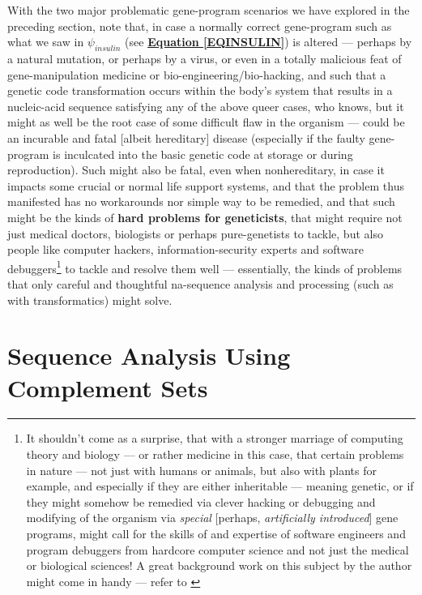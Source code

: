 \documentclass[a4paper, 18pt]{book} %
\begin{document}
With the two major problematic gene-program scenarios we have explored in the preceding section, note that, in case a normally correct gene-program such as what we saw in $\psi_{insulin}$ (see \textbf{\hyperref[EQINSULIN]{Equation \ref{EQINSULIN}}}) is altered --- perhaps by a natural mutation, or perhaps by a virus, or even in a totally malicious feat of gene-manipulation medicine or bio-engineering/bio-hacking, and such that a genetic code transformation occurs within the body's system that results in a nucleic-acid sequence satisfying any of the above queer cases, who knows, but it might as well be the root case of some difficult flaw in the organism --- could be an incurable and fatal [albeit hereditary] disease (especially if the faulty gene-program is inculcated into the basic genetic code at storage or during reproduction). Such might also be fatal, even when nonhereditary, in case it impacts some crucial or normal life support systems, and that the problem thus manifested has no workarounds nor simple way to be remedied, and that such might be the kinds of \textbf{hard problems for geneticists}, that might require not just medical doctors, biologists or perhaps pure-genetists to tackle, but also people like computer hackers, information-security experts and software debuggers\footnote{It shouldn't come as a surprise, that with a stronger marriage of computing theory and biology --- or rather medicine in this case, that certain problems in nature --- not just with humans or animals, but also with plants for example, and especially if they are either inheritable --- meaning genetic, or if they might somehow be remedied via clever hacking or debugging and modifying of the organism via \textit{special} [perhaps, \textit{artificially introduced}] gene programs, might call for the skills of and expertise of software engineers and program debuggers from hardcore computer science and not just the medical or biological sciences! A great background work on this subject by the author might come in handy --- refer to \cite{Lutalo2025debug}} to tackle and resolve them well --- essentially, the kinds of problems that only careful and thoughtful na-sequence analysis and processing (such as with transformatics) might solve.



\chapter{Sequence Analysis Using Complement Sets}
\label{SEC3A}
\end{document}

